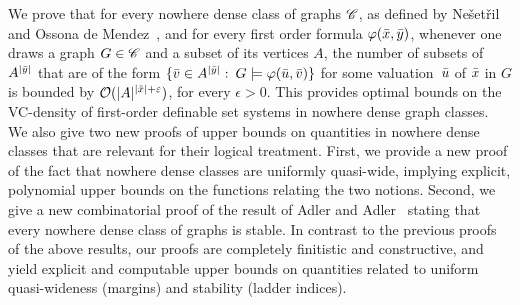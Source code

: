 We prove that for every nowhere dense class of graphs $\mathscr{C}$, as
defined by Ne\v set\v ril and Ossona de
Mendez~\cite{nevsetvril2010first,nevsetvril2011nowhere}, and for every
first order formula $\varphi(\bar{x},\bar{y})$, whenever one draws a graph
$G\in \mathscr{C}$ and a subset of its vertices $A$, the number of subsets of
$A^{|\bar{y}|}$ that are of the form $\{\bar{v}\in A^{|\bar{y}|}\,
\colon\, G\models\varphi(\bar u,\bar{v})\}$ for some valuation~$\bar{u}$ of
$\bar{x}$ in $G$ is bounded by $\mathcal{O}(|A|^{|\bar{x}|+\varepsilon})$, for
every $\epsilon>0$. This provides optimal bounds on the VC-density of
first-order definable set systems in nowhere dense graph classes.
%
We also give two new proofs of upper bounds on quantities in nowhere
dense classes that are relevant for their logical treatment. First, we
provide a new proof of the fact that nowhere dense classes are
uniformly quasi-wide, implying explicit, polynomial upper bounds on
the functions relating the two notions. Second, we give a new
combinatorial proof of the result of Adler and
Adler~\cite{adler2014interpreting} stating that every nowhere dense
class of graphs is stable. In contrast to the previous proofs of the
above results, our proofs are completely finitistic and constructive,
and yield explicit and computable upper bounds on quantities related
to uniform quasi-wideness (margins) and stability (ladder indices).
